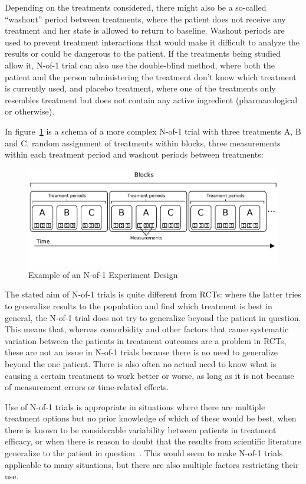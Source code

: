 \documentclass[12pt,a4paper,leqno]{report}
\theoremstyle{plain}
\theoremstyle{definition}
\theoremstyle{remark}
\begin{document}
Depending on the treatments considered, there might also be a so-called
``washout'' period between treatments, where the patient does not receive any
treatment and her state is allowed to return to baseline. Washout periods are used to
prevent treatment interactions that would make it difficult to analyze the
results or could be dangerous to the patient. If the treatments being studied
allow it, N-of-1 trial can also use the double-blind method, where both the patient
and the person administering the treatment don't know which treatment is currently used, and placebo
treatment, where one of the treatments only resembles treatment but does not
contain any active ingredient (pharmacological or otherwise).

In figure\ \ref{examplenof1schema} is a schema of a more complex N-of-1 trial with three treatments A, B and C,
random assignment of treatments within blocks, three measurements within each
treatment period and washout periods between treatments:

\begin{figure}[H]
    \centering
    \caption{Example of an N-of-1 Experiment Design}\label{examplenof1schema}
    \includegraphics{n-of-1_schema.pdf}
\end{figure}

The stated aim of N-of-1 trials is quite different from RCTs: where the latter
tries to generalize results to the population and find which treatment is best in
general, the N-of-1 trial does not try to generalize beyond the patient in question.
This means that, whereas comorbidity and other factors that cause systematic
variation between the patients in treatment outcomes are a problem in RCTs,
these are not an issue in N-of-1 trials because there is no need to generalize
beyond the one patient. There is also often no actual need to know what is
causing a certain treatment to work better or worse, as long as it is not
because of measurement errors or time-related effects.

Use of N-of-1 trials is appropriate in situations where there are multiple
treatment options but no prior knowledge of which of these would be
best, when there is known to be considerable variability between patients in
treatment efficacy, or when there is reason to doubt that the results from
scientific literature generalize to the patient in question\ \cite{nofone}. This
would seem to make N-of-1 trials applicable to many situations, but there are
also multiple factors restricting their use.
\end{document}
